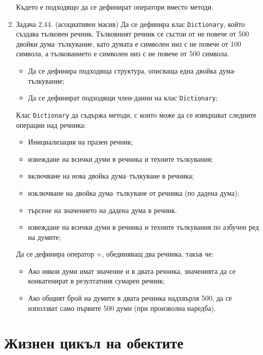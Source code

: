 \begin{enumerate}
Където е подходящо да се дефинират оператори вместо методи.


\item Задача 2.44. \cite{sbornik2} (асоциативен масив) Да се дефинира клас \texttt{Dictionary}, който създава тълковен речник. Тълковният речник се състои от не повече от 500 двойки дума–тълкувание, като думата е символен низ с не повече от 100 символа, а тълкованието е символен низ с не повече от 500 символа.

\begin{itemize}
	\item Да се дефинира подходяща структура, описваща една двойка дума-тълкувание;
	\item Да се дефинират подходящи член-данни на клас \texttt{Dictionary};
\end{itemize}

Клас \texttt{Dictionary} да съдържа методи, с които може да се извършват следните операции над речника:

\begin{itemize}

\item Инициализация на празен речник;
\item извеждане на всички думи в речника и техните тълкувания;
\item включване на нова двойка дума–тълкуване в речника;
\item изключване на двойка дума–тълкуване от речника (по дадена дума);
\item търсене на значението на дадена дума в речник.
\item извеждане на всички думи в речника и техните тълкувания по азбучен ред на думите;
\end{itemize}

Да се дефинира оператор +, обединяващ два речника, такъв че:

\begin{itemize}
 \item Ако някои думи имат значение и в двата речника, значенията да се конкатенират в резултатния сумарен речник;
 \item Ако общият брой на думите в двата речника надхвърля 500, да се използват само първите 500 думи (при произволна наредба).
\end{itemize}


\end{enumerate}


\pagebreak

\clearpage\section {Жизнен цикъл на обектите}

